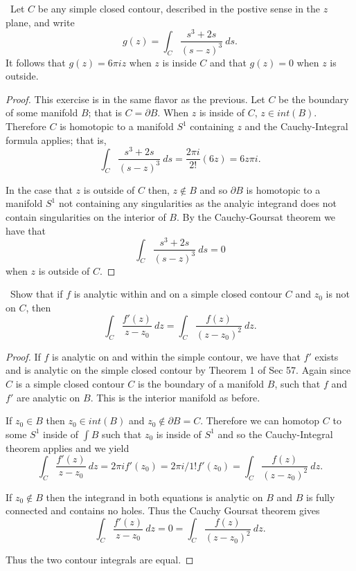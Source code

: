 \documentclass[11pt]{amsart}
\theoremstyle{definition}
\numberwithin{theorem}{section}
\numberwithin{definition}{section}
\numberwithin{equation}{section}
\begin{document}
\medskip {}\ Let $C$ be any simple closed contour, described in the postive sense in the $z$ plane, and write
\begin{equation*}
	g(z) = \int_C \frac{s^3 + 2s}{(s-z)^3}\ ds.
\end{equation*}
It follows that $g(z) = 6\pi i z$ when $z$ is inside $C$ and that $g(z) = 0$ when $z$ is outside.
\begin{proof}
	This exercise is in the same flavor as the previous. Let $C$ be the boundary of some manifold $B$; that is $C = \partial B$. When $z$ is inside of $C$, $z \in int(B)$. Therefore $C$ is homotopic to a manifold $S^1$ containing $z$
	and the Cauchy-Integral formula applies; that is,
	\begin{equation*}
		\int_C \frac{s^3 + 2s}{(s-z)^3}\ ds =  \frac{2\pi i}{2!} (6z) = 6z\pi i.
	\end{equation*}

	In the case that $z$ is outside of $C$ then, $z \notin B$ and so $\partial B$ is homotopic to a manifold $S^1$ not containing any singularities as the analyic integrand does not contain singularities on the interior of $B$.  By the Cauchy-Goursat theorem we have that 
	\begin{equation*}
		\int_C \frac{s^3 + 2s}{(s-z)^3}\ ds = 0
	\end{equation*}
	when $z$ is outside of $C$. 
\end{proof}


\medskip {}\ Show that if $f$ is analytic within and on a simple closed contour $C$ and $z_0$ is not on $C$, then
\begin{equation*}
	\int_C \frac{f'(z)}{z- z_0}\ dz = \int_C \frac{f(z)}{(z-z_0)^2}\ dz.
\end{equation*}
\begin{proof}
	If $f$ is analytic on and within the simple contour, we have that $f'$ exists and is analytic on the simple closed contour by  Theorem 1 of Sec 57. Again since $C$ is a simple closed contour $C$ is the boundary of a manifold $B$,
	such that $f$ and $f'$ are analytic on $B$. This is the interior manifold as before. 

	If $z_0 \in B$ then $z_0 \in int(B) $ and $z_0 \notin \partial B = C$. Therefore we can homotop $C$ to some $S^1$ inside of $\int B$ such that $z_0$ is inside of $S^1$ and so the Cauchy-Integral theorem applies and we yield
	\begin{equation*}
	\int_C \frac{f'(z)}{z- z_0}\ dz = 2\pi i f'(z_0) = 2\pi i/1! f'(z_0) = \int_C \frac{f(z)}{(z-z_0)^2}\ dz.
	\end{equation*}

	If $z_0 \notin B$ then the integrand in both equations is analytic on $B$ and $B$ is fully connected and contains no holes. Thus the Cauchy Goursat theorem gives
	\begin{equation*}
	\int_C \frac{f'(z)}{z- z_0}\ dz = 0 = \int_C \frac{f(z)}{(z-z_0)^2}\ dz.
	\end{equation*}

	Thus the two contour integrals are equal.
\end{proof}
\end{document}

